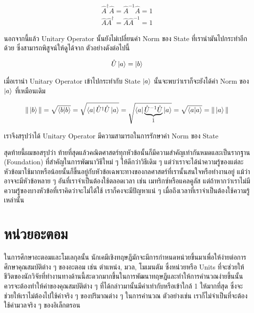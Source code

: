 \begin{equation}
    \begin{split}
        \hat{A}^\dagger \hat{A} = \hat{A}^{-1} \hat{A} = 1 \\
        \hat{A} \hat{A}^\dagger = \hat{A} \hat{A}^{-1} = 1
    \end{split}
\end{equation}

\noindent นอกจากนี้แล้ว Unitary Operator นั้นยังไม่เปลี่ยนค่า Norm ของ State ที่เรานำมันไปกระทำอีกด้วย ซึ่งสามารถพิสูจน์ให้ดูได้จาก%
ตัวอย่างดังต่อไปนี้

\begin{equation}
    \hat{U} \ket{a}
    =
    \ket{b}
\end{equation}

\noindent เมื่อเรานำ Unitary Operator เข้าไปกระทำกับ State $\ket{a}$ นั้นจะพบว่าเราก็จะยังได้ค่า Norm ของ $\ket{a}$ ที่เหมือนเดิม

\begin{equation}
    \| \ket{b} \|
    =
    \sqrt{\braket{b}{b}}
    =
    \sqrt{\bra{a}\hat{U}^\dagger \hat{U} \ket{a}}
    =
    \sqrt{\bra{a} \underbrace{\hat{U}^{-1} \hat{U}}_{\hat{1}} \ket{a}}
    =
    \sqrt{\braket{a}{a}}
    =
    \| \ket{a} \|
\end{equation}

\noindent เราจึงสรุปว่าได้ Unitary Operator มีความสามารถในการรักษาค่า Norm ของ State

สุดท้ายนี้ผมขอสรุปว่า ท้ายที่สุดแล้วคณิตศาสตร์ทุกหัวข้อนั้นก็มีความสำคัญเท่ากันหมดและเป็นรากฐาน (Foundation) ที่สำคัญในการพัฒนาวิธีใหม่ ๆ
ให้ดีกว่าวิธีเดิม ๆ แต่ว่าเราจะได้นำความรู้ของแต่ละหัวข้อมาใช้มากหรือน้อยนั้นก็ขึ้นอยู่กับหัวข้อเฉพาะทางของกลศาสตร์ที่เรานั้นสนใจหรือทำงานอยู่
แม้ว่าอาจจะมีหัวข้อหลาย ๆ อันที่เราจำเป็นต้องใช้ตลอดเวลา เช่น เมทริกซ์หรือแคลคูลัส แต่ถ้าหากว่าเราไม่มีความรู้ของบางหัวข้อที่เราคิดว่าจะไม่ได้ใช้
เราก็คงจะมีปัญหาแน่ ๆ เมื่อถึงเวลาที่เราจำเป็นต้องใช้ความรู้เหล่านั้น

\section{หน่วยอะตอม}

ในการศึกษาอะตอมและโมเลกุลนั้น นักเคมีเชิงทฤษฎีมักจะมีการกำหนดหน่วยขึ้นมาเพื่อให้ง่ายต่อการศึกษาคุณสมบัติต่าง ๆ ของอะตอม เช่น ตำแหน่ง,
มวล, โมเมนตัม ซึ่งหน่วยหรือ Units ที่จะช่วยให้ชีวิตของนักวิจัยที่ทำงานทางด้านนี้สะดวกมากขึ้นในการพัฒนาทฤษฎีและทำให้การคำนวณง่ายขึ้นนั้น%
ควรจะต้องทำให้ค่าของคุณสมบัติต่าง ๆ ที่ได้กล่าวมานั้นมีค่าเท่ากับหรือเข้าใกล้ 1 ให้มากที่สุด ซึ่งจะช่วยให้เราไม่ต้องไปใช้ค่าจริง ๆ ของปริมาณต่าง ๆ
ในการคำนวณ ตัวอย่างเช่น เราก็ไม่จำเป็นที่จะต้องใช้ค่ามวลจริง ๆ ของอิเล็กตรอน

